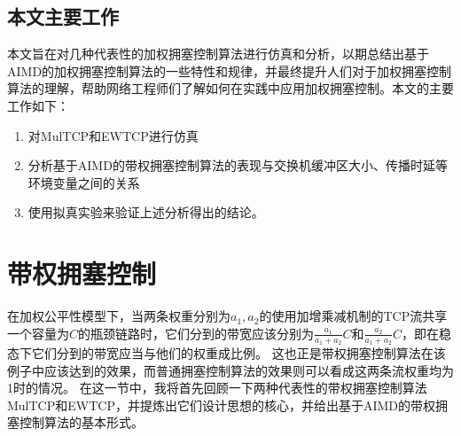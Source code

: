 \documentclass[winfonts]{njuthesis}
\begin{document}
\section{本文主要工作}
本文旨在对几种代表性的加权拥塞控制算法进行仿真和分析，以期总结出基于AIMD的加权拥塞控制算法的一些特性和规律，并最终提升人们对于加权拥塞控制算法的理解，帮助网络工程师们了解如何在实践中应用加权拥塞控制。本文的主要工作如下：
\begin{enumerate}
\item 对MulTCP和EWTCP进行仿真

\item 分析基于AIMD的带权拥塞控制算法的表现与交换机缓冲区大小、传播时延等环境变量之间的关系

\item 使用拟真实验来验证上述分析得出的结论。
\end{enumerate}



\chapter{带权拥塞控制}\label{chapter:wcc}

在加权公平性模型下，当两条权重分别为$a_1, a_2$的使用加增乘减机制的TCP流共享一个容量为$C$的瓶颈链路时，它们分到的带宽应该分别为$\frac{a_1}{a_1 + a_2}C$和$\frac{a_2}{a_1 + a_2}C$，即在稳态下它们分到的带宽应当与他们的权重成比例。
这也正是带权拥塞控制算法在该例子中应该达到的效果，而普通拥塞控制算法的效果则可以看成这两条流权重均为1时的情况。
在这一节中，我将首先回顾一下两种代表性的带权拥塞控制算法MulTCP\cite{crowcroft1998differentiated}和EWTCP\cite{wischik2011design}，并提炼出它们设计思想的核心，并给出基于AIMD的带权拥塞控制算法的基本形式。
\end{document}
